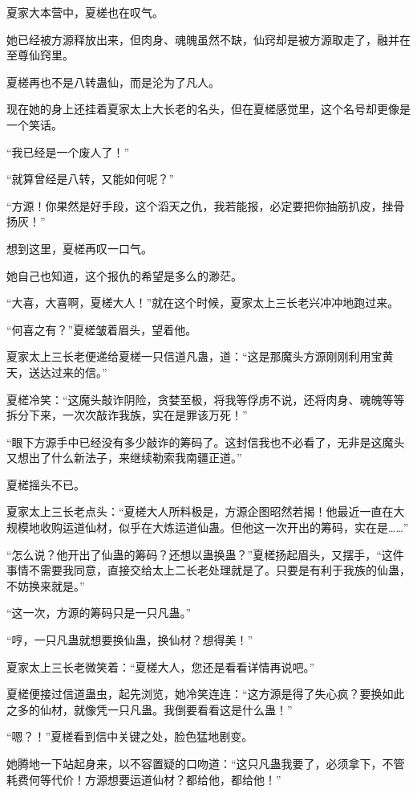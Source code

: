 \begin{this_body}
夏家大本营中，夏槎也在叹气。

她已经被方源释放出来，但肉身、魂魄虽然不缺，仙窍却是被方源取走了，融并在至尊仙窍里。

夏槎再也不是八转蛊仙，而是沦为了凡人。

现在她的身上还挂着夏家太上大长老的名头，但在夏槎感觉里，这个名号却更像是一个笑话。

“我已经是一个废人了！”

“就算曾经是八转，又能如何呢？”

“方源！你果然是好手段，这个滔天之仇，我若能报，必定要把你抽筋扒皮，挫骨扬灰！”

想到这里，夏槎再叹一口气。

她自己也知道，这个报仇的希望是多么的渺茫。

“大喜，大喜啊，夏槎大人！”就在这个时候，夏家太上三长老兴冲冲地跑过来。

“何喜之有？”夏槎皱着眉头，望着他。

夏家太上三长老便递给夏槎一只信道凡蛊，道：“这是那魔头方源刚刚利用宝黄天，送达过来的信。”

夏槎冷笑：“这魔头敲诈阴险，贪婪至极，将我等俘虏不说，还将肉身、魂魄等等拆分下来，一次次敲诈我族，实在是罪该万死！”

“眼下方源手中已经没有多少敲诈的筹码了。这封信我也不必看了，无非是这魔头又想出了什么新法子，来继续勒索我南疆正道。”

夏槎摇头不已。

夏家太上三长老点头：“夏槎大人所料极是，方源企图昭然若揭！他最近一直在大规模地收购运道仙材，似乎在大炼运道仙蛊。但他这一次开出的筹码，实在是……”

“怎么说？他开出了仙蛊的筹码？还想以蛊换蛊？”夏槎扬起眉头，又摆手，“这件事情不需要我同意，直接交给太上二长老处理就是了。只要是有利于我族的仙蛊，不妨换来就是。”

“这一次，方源的筹码只是一只凡蛊。”

“哼，一只凡蛊就想要换仙蛊，换仙材？想得美！”

夏家太上三长老微笑着：“夏槎大人，您还是看看详情再说吧。”

夏槎便接过信道蛊虫，起先浏览，她冷笑连连：“这方源是得了失心疯？要换如此之多的仙材，就像凭一只凡蛊。我倒要看看这是什么蛊！”

“嗯？！”夏槎看到信中关键之处，脸色猛地剧变。

她腾地一下站起身来，以不容置疑的口吻道：“这只凡蛊我要了，必须拿下，不管耗费何等代价！方源想要运道仙材？都给他，都给他！”

\end{this_body}

